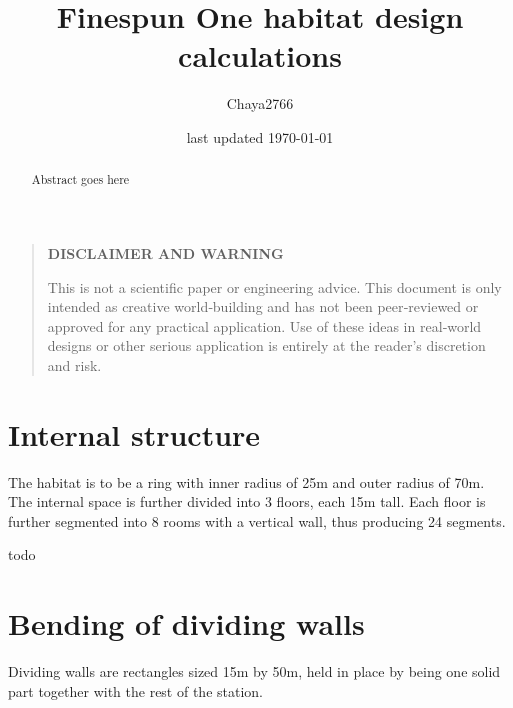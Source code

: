 \documentclass[a4paper]{article}
\title{Finespun One habitat design calculations}
\author{Chaya2766}
\date{last updated \today}
\begin{document}
	\sffamily
	\hyphenchar{}
	\sloppy
	
	\maketitle
	
	\textbf{
		\sloppy
		\hyphenchar{}
		}
	
	\vfill
	
	\begin{abstract}
		Abstract goes here
	\end{abstract}
	
	\vfill
	
	\begin{quote}
		\begin{center}
			\textbf{DISCLAIMER AND WARNING}
		\end{center}
		
		This is not a scientific paper or engineering advice.
		This document is only intended as creative world‑building and has not been peer‑reviewed or approved for any practical application.
		Use of these ideas in real‑world designs or other serious application is entirely at the reader’s discretion and risk.
	\end{quote}
	
	\vfill
	
	\tableofcontents
	
	\pagebreak
	
	\section{Internal structure}
	
	The habitat is to be a ring with inner radius of 25m and outer radius of 70m.
	The internal space is further divided into 3 floors, each 15m tall.
	Each floor is further segmented into 8 rooms with a vertical wall, thus producing 24 segments.
	
	\medskip
	
	todo
    
	\pagebreak
	
	\section{Bending of dividing walls}
	
    Dividing walls are rectangles sized 15m by 50m, held in place by being one solid part together with the rest of the station.
    
\end{document}
